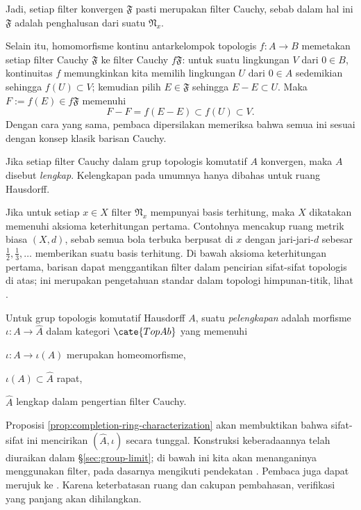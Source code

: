\begin{description}
\begin{compactenum}[(a)]
			\item Jadi, setiap filter konvergen $\mathfrak{F}$ pasti merupakan filter Cauchy, sebab dalam hal ini $\mathfrak{F}$ adalah penghalusan dari suatu $\mathfrak{N}_x$.
		\end{compactenum}
		Selain itu, homomorfisme kontinu antarkelompok topologis $f: A \to B$ memetakan setiap filter Cauchy $\mathfrak{F}$ ke filter Cauchy $f\mathfrak{F}$: untuk suatu lingkungan $V$ dari $0 \in B$, kontinuitas $f$ memungkinkan kita memilih lingkungan $U$ dari $0 \in A$ sedemikian sehingga $f(U) \subset V$; kemudian pilih $E \in \mathfrak{F}$ sehingga $E-E \subset U$. Maka $F := f(E) \in f\mathfrak{F}$ memenuhi
		\[ F - F = f(E-E) \subset f(U) \subset V. \]
		Dengan cara yang sama, pembaca dipersilakan memeriksa bahwa semua ini sesuai dengan konsep klasik barisan Cauchy.
	\item[Kelengkapan] Jika setiap filter Cauchy dalam grup topologis komutatif $A$ konvergen, maka $A$ disebut \emph{lengkap}. Kelengkapan pada umumnya hanya dibahas untuk ruang Hausdorff.
\end{description}

Jika untuk setiap $x \in X$ filter $\mathfrak{N}_x$ mempunyai basis terhitung, maka $X$ dikatakan memenuhi aksioma keterhitungan pertama. Contohnya mencakup ruang metrik biasa $(X, d)$, sebab semua bola terbuka berpusat di $x$ dengan jari-jari-$d$ sebesar $\frac{1}{2}, \frac{1}{3}, \ldots$ memberikan suatu basis terhitung. Di bawah aksioma keterhitungan pertama, barisan dapat menggantikan filter dalam pencirian sifat-sifat topologis di atas; ini merupakan pengetahuan standar dalam topologi himpunan-titik, lihat \cite[\S 5.1]{Xiong}.

Untuk grup topologis komutatif Hausdorff $A$, suatu \emph{pelengkapan} adalah morfisme $\iota: A \to \hat{A}$ dalam kategori $\cate{TopAb}$ yang memenuhi 
\begin{compactenum}[(\bfseries {CO}.1)]
	\item $\iota: A \to \iota(A)$ merupakan homeomorfisme,
	\item $\iota(A) \subset \hat{A}$ rapat,
	\item $\hat{A}$ lengkap dalam pengertian filter Cauchy.
\end{compactenum}
Proposisi \ref{prop:completion-ring-characterization} akan membuktikan bahwa sifat-sifat ini mencirikan $(\hat{A}, \iota)$ secara tunggal. Konstruksi keberadaannya telah diuraikan dalam \S\ref{sec:group-limit}; di bawah ini kita akan menanganinya menggunakan filter, pada dasarnya mengikuti pendekatan \cite[\S 8]{Str06}. Pembaca juga dapat merujuk ke \cite[Chapitre III]{Bou-Top1}. Karena keterbatasan ruang dan cakupan pembahasan, verifikasi yang panjang akan dihilangkan.

